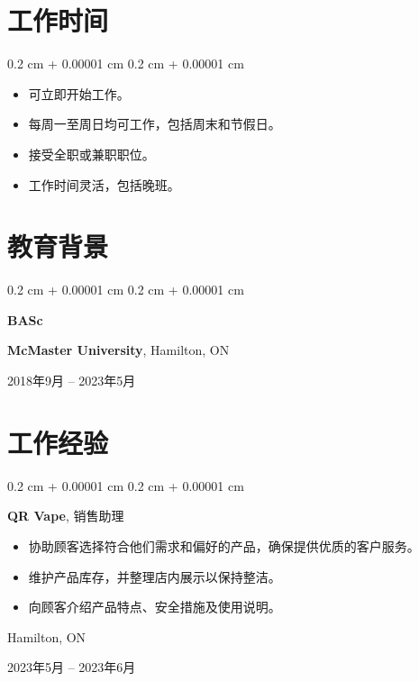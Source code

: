 \documentclass[10pt, letterpaper]{article}
\newenvironment{highlights}{
    \begin{itemize}[
        topsep=0.10 cm,
        parsep=0.10 cm,
        partopsep=0pt,
        itemsep=0pt,
        leftmargin=0.4 cm + 10pt
    ]
}{
    \end{itemize}
} %
\newenvironment{highlightsforbulletentries}{
    \begin{itemize}[
        topsep=0.10 cm,
        parsep=0.10 cm,
        partopsep=0pt,
        itemsep=0pt,
        leftmargin=10pt
    ]
}{
    \end{itemize}
} %
\newenvironment{onecolentry}{
    \begin{adjustwidth}{
        0.2 cm + 0.00001 cm
    }{
        0.2 cm + 0.00001 cm
    }
}{
    \end{adjustwidth}
} %
\newenvironment{twocolentry}[2][]{
    \onecolentry
    \def\secondColumn{#2}
    \setcolumnwidth{\fill, 4.5 cm}
    \begin{paracol}{2}
}{
    \switchcolumn \raggedleft \secondColumn
    \end{paracol}
    \endonecolentry
} %
\newenvironment{threecolentry}[3][]{
    \onecolentry
    \def\thirdColumn{#3}
    \setcolumnwidth{1 cm, \fill, 4.5 cm}
    \begin{paracol}{3}
    {\raggedright #2} \switchcolumn
}{
    \switchcolumn \raggedleft \thirdColumn
    \end{paracol}
    \endonecolentry
} %
\let\hrefWithoutArrow\href
\renewcommand{\href}[2]{\hrefWithoutArrow{#1}{\ifthenelse{\equal{#2}{}}{ }{#2 }\raisebox{.15ex}{\footnotesize \faExternalLink*}}}
\begin{document}

    
    \section{工作时间}

    \begin{onecolentry}
        \begin{highlightsforbulletentries}

        \item 可立即开始工作。
        
        \item 每周一至周日均可工作，包括周末和节假日。

        \item 接受全职或兼职职位。

        \item 工作时间灵活，包括晚班。

        \end{highlightsforbulletentries}
    \end{onecolentry}

    \section{教育背景}
        
        \begin{threecolentry}{\textbf{BASc}}{
            2018年9月 – 2023年5月
        }
            \textbf{McMaster University}, Hamilton, ON
        \end{threecolentry}


    
    \section{工作经验}



        
        \begin{twocolentry}{
            Hamilton, ON

        2023年5月 – 2023年6月
        }
            \textbf{QR Vape}, 销售助理
            \begin{highlights}
                \item 协助顾客选择符合他们需求和偏好的产品，确保提供优质的客户服务。
                \item 维护产品库存，并整理店内展示以保持整洁。
                \item 向顾客介绍产品特点、安全措施及使用说明。
            \end{highlights}
        \end{twocolentry}
\end{document}
